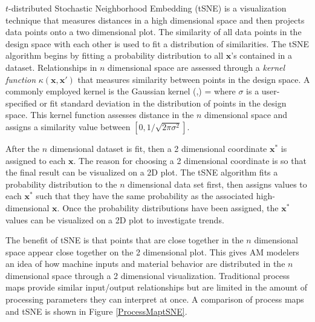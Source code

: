 $t$-distributed Stochastic Neighborhood Embedding (tSNE) is a visualization technique that measures distances in a high dimensional space and then projects data points onto a two dimensional plot. The similarity of all data points in the design space with each other is used to fit a distribution of similarities. The tSNE algorithm begins by fitting a probability distribution to all $\mathbf{x}$'s contained in a dataset. Relationships in $n$ dimensional space are assessed through a \textit{kernel function} $\kappa(\mathbf{x},\mathbf{x'})$ that measures similarity between points in the design space. A commonly employed kernel is the Gaussian kernel
\eqn
	\kappa(,) = 
	\label{gausskernel}
\equ 
where $\sigma$ is a user-specified or fit standard deviation in the distribution of points in the design space. This kernel function assesses distance in the $n$ dimensional space and assigns a similarity value between $\left[0, 1/\sqrt{2\pi\sigma^2}\right]$. 

 After the $n$ dimensional dataset is fit, then a 2 dimensional coordinate $\mathbf{x}^*$ is assigned to each $\mathbf{x}$. The reason for choosing a 2 dimensional coordinate is so that the final result can be visualized on a 2D plot. The tSNE algorithm fits a probability distribution to the $n$ dimensional data set first, then assigns values to each $\mathbf{x}^*$ such that they have the same probability as the associated high-dimensional $\mathbf{x}$. Once the probability distributions have been assigned, the $\mathbf{x}^*$ values can be visualized on a 2D plot to investigate trends.

The benefit of tSNE is that points that are close together in the $n$ dimensional space appear close together on the 2 dimensional plot. This gives AM modelers an idea of how machine inputs and material behavior are distributed in the $n$ dimensional space through a 2 dimensional visualization. Traditional process maps provide similar input/output relationships but are limited in the amount of processing parameters they can interpret at once. A comparison of process maps and tSNE is shown in Figure \ref{ProcessMaptSNE}.
